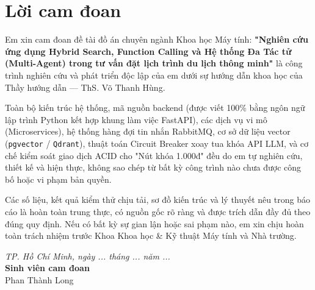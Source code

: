 \section*{Lời cam đoan}
\thispagestyle{empty}

Em xin cam đoan đề tài đồ án chuyên ngành Khoa học Máy tính: \textbf{"Nghiên cứu ứng dụng Hybrid Search, Function Calling và Hệ thống Đa Tác tử (Multi-Agent) trong tư vấn đặt lịch trình du lịch thông minh"} là công trình nghiên cứu và phát triển độc lập của em dưới sự hướng dẫn khoa học của Thầy hướng dẫn --- ThS. Võ Thanh Hùng.

Toàn bộ kiến trúc hệ thống, mã nguồn backend (được viết 100\% bằng ngôn ngữ lập trình Python kết hợp khung làm việc FastAPI), các dịch vụ vi mô (Microservices), hệ thống hàng đợi tin nhắn RabbitMQ, cơ sở dữ liệu vector (\texttt{pgvector} / \texttt{Qdrant}), thuật toán Circuit Breaker xoay tua khóa API LLM, và cơ chế kiểm soát giao dịch ACID cho "Nút khóa 1.000đ" đều do em tự nghiên cứu, thiết kế và hiện thực, không sao chép từ bất kỳ công trình nào chưa được công bố hoặc vi phạm bản quyền.

Các số liệu, kết quả kiểm thử chịu tải, sơ đồ kiến trúc và lý thuyết nêu trong báo cáo là hoàn toàn trung thực, có nguồn gốc rõ ràng và được trích dẫn đầy đủ theo đúng quy định. Nếu có bất kỳ sự gian lận hoặc sai phạm nào, em xin chịu hoàn toàn trách nhiệm trước Khoa Khoa học \& Kỹ thuật Máy tính và Nhà trường.

\vspace{1.5cm}
\begin{flushright}
\textit{TP. Hồ Chí Minh, ngày ... tháng ... năm ...}\\
\textbf{Sinh viên cam đoan}\\
\vspace{1.5cm}
Phan Thành Long
\end{flushright}

\clearpage
{}
